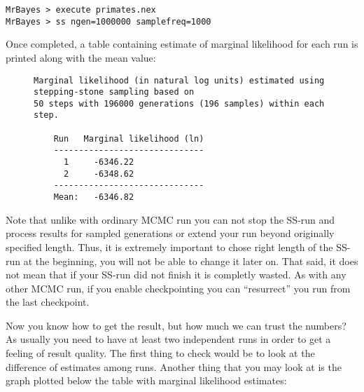 \documentclass[12pt]{book}
\begin{document}
\begin{Verbatim}
MrBayes > execute primates.nex
MrBayes > ss ngen=1000000 samplefreq=1000
\end{Verbatim}

Once completed, a table containing estimate of marginal likelihood for each run is printed along
with the mean value:

\begin{figure}[h]
\centering
\begin{BVerbatim}
Marginal likelihood (in natural log units) estimated using stepping-stone sampling based on
50 steps with 196000 generations (196 samples) within each step.

    Run   Marginal likelihood (ln)
    ------------------------------
      1     -6346.22
      2     -6348.62
    ------------------------------
    Mean:   -6346.82
\end{BVerbatim}
\end{figure}

Note that unlike with ordinary MCMC run you can not stop the SS-run and process results for sampled
generations or extend your run beyond originally specified length. Thus, it is extremely important
to chose right length of the SS-run at the beginning, you will not be able to change it later on.
That said, it does not mean that if your SS-run did not finish it is completly wasted. As with any
other MCMC run, if you enable checkpointing you can ``resurrect'' you run from the last checkpoint.

Now you know how to get the result, but how much we can trust the numbers? As usually you need to
have at least two independent runs in order to get a feeling of result quality. The first thing to
check would be to look at the difference of estimates among runs. Another thing that you may look
at is the graph plotted below the table with marginal likelihood estimates:
\end{document}

